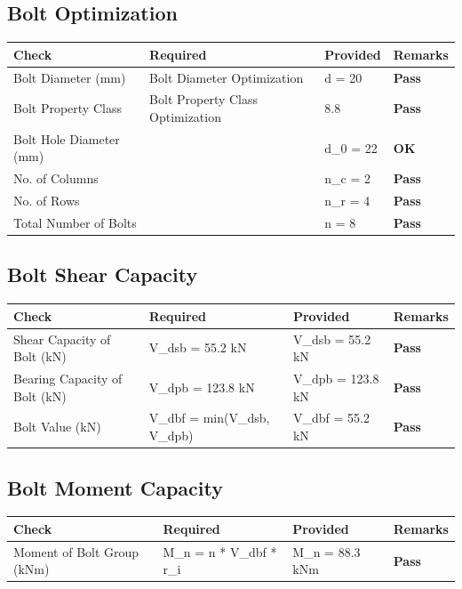 \documentclass{article}%
\begin{document}
%
%
\subsection{ Bolt Optimization}%
\label{subsec:BoltOptimization}%
\renewcommand{\arraystretch}{1.2}%
\begin{longtable}{|p{3.5cm}|p{6cm}|p{5cm}|p{1.5cm}|}%
\hline%
\rowcolor{OsdagGreen}%
Check&Required&Provided&Remarks\\%
\hline%
\endhead%
\hline%
Bolt Diameter (mm)&Bolt Diameter Optimization&d = 20&\textcolor{OsdagGreen}{%
\textbf{Pass}%
}\\%
\hline%
Bolt Property Class&Bolt Property Class Optimization&8.8&\textcolor{OsdagGreen}{%
\textbf{Pass}%
}\\%
\hline%
Bolt Hole Diameter (mm)& &d\_0 = 22&\textcolor{OsdagGreen}{%
\textbf{OK}%
}\\%
\hline%
No. of Columns&&n\_c = 2&\textcolor{OsdagGreen}{%
\textbf{Pass}%
}\\%
\hline%
No. of Rows&&n\_r = 4&\textcolor{OsdagGreen}{%
\textbf{Pass}%
}\\%
\hline%
Total Number of Bolts&&n = 8&\textcolor{OsdagGreen}{%
\textbf{Pass}%
}\\%
\hline%
\end{longtable}

%
%
\subsection{Bolt Shear Capacity}%
\label{subsec:BoltShearCapacity}%
\renewcommand{\arraystretch}{1.2}%
\begin{longtable}{|p{3.5cm}|p{6cm}|p{5cm}|p{1.5cm}|}%
\hline%
\rowcolor{OsdagGreen}%
Check&Required&Provided&Remarks\\%
\hline%
\endhead%
\hline%
Shear Capacity of Bolt (kN)&V\_dsb = 55.2 kN&V\_dsb = 55.2 kN&\textcolor{OsdagGreen}{%
\textbf{Pass}%
}\\%
\hline%
Bearing Capacity of Bolt (kN)&V\_dpb = 123.8 kN&V\_dpb = 123.8 kN&\textcolor{OsdagGreen}{%
\textbf{Pass}%
}\\%
\hline%
Bolt Value (kN)&V\_dbf = min(V\_dsb, V\_dpb)&V\_dbf = 55.2 kN&\textcolor{OsdagGreen}{%
\textbf{Pass}%
}\\%
\hline%
\end{longtable}

%
%
\subsection{Bolt Moment Capacity}%
\label{subsec:BoltMomentCapacity}%
\renewcommand{\arraystretch}{1.2}%
\begin{longtable}{|p{3.5cm}|p{6cm}|p{5cm}|p{1.5cm}|}%
\hline%
\rowcolor{OsdagGreen}%
Check&Required&Provided&Remarks\\%
\hline%
\endhead%
\hline%
Moment of Bolt Group (kNm)&M\_n = n * V\_dbf * r\_i&M\_n = 88.3 kNm&\textcolor{OsdagGreen}{%
\textbf{Pass}%
}\\%
\hline%
\end{longtable}
\end{document}

